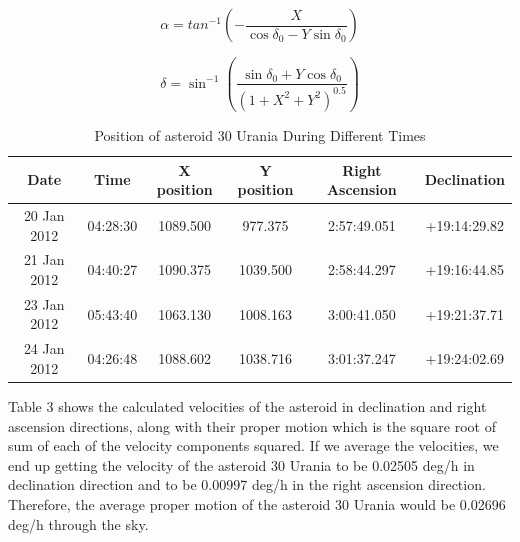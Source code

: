 \documentclass[letterpaper,12pt]{article}
\begin{document}
\begin{equation}
\alpha = tan^{-1}(-\frac{X}{\cos\delta_{0} - Y\sin\delta_{0}})
\end{equation}

\begin{equation}
\delta = \sin^{-1}(\frac{\sin\delta_{0} + Y\cos\delta_{0}}{(1+X^2+Y^2)^{0.5}})
\end{equation}


        
\FloatBarrier
\begin{table}[h!]
\caption{Position of asteroid 30 Urania During Different Times} %
\centering %
\begin{tabular}{c c c c c c } %
\hline\hline %
Date & Time & X position & Y position & Right Ascension & Declination\\ [0.5ex] %
\hline %
20 Jan 2012 & 04:28:30  & 1089.500 & 977.375 &  2:57:49.051 & +19:14:29.82\\ %
21 Jan 2012 & 04:40:27  & 1090.375 & 1039.500 & 2:58:44.297 & +19:16:44.85\\
23 Jan 2012 & 05:43:40  & 1063.130 & 1008.163  & 3:00:41.050  & +19:21:37.71\\
24 Jan 2012 & 04:26:48  & 1088.602 & 1038.716 & 3:01:37.247 & +19:24:02.69\\ [1ex] %
\hline %
\end{tabular}
\label{table:nonlin} %
\end{table}
\FloatBarrier


Table 3 shows the calculated velocities of the asteroid in declination and right ascension directions, along with their proper motion which is the square root of sum of each of the velocity components squared. If we average the velocities, we end up getting the velocity of the asteroid 30 Urania to be 0.02505 deg/h in declination direction and to be 0.00997 deg/h in the right ascension direction. Therefore, the average proper motion of the asteroid 30 Urania would be 0.02696 deg/h through the sky.


\end{document}

